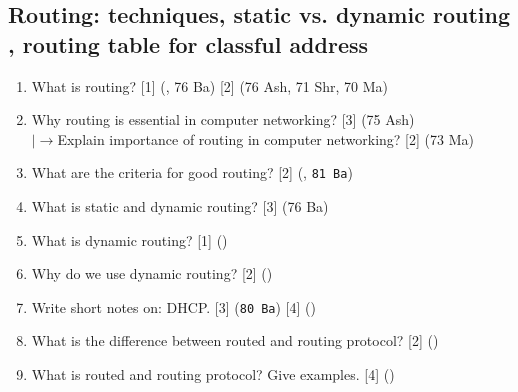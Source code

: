 \documentclass[12pt]{article}
\newcommand{\lb}{\\$\left|\rightarrow\right.$}
\begin{document}
	\subsection{Routing: techniques, static vs. dynamic routing , routing table for classful address}
		\begin{enumerate}[noitemsep, topsep=0pt]
			\item What is routing? \hfill [1] (, 76 Ba) [2] (76 Ash, 71 Shr, 70 Ma)

			\item Why routing is essential in computer networking? \hfill [3] (75 Ash)
			\lb Explain importance of routing in computer networking? \hfill [2] (73 Ma)
			
			\item What are the criteria for good routing? \hfill [2] (, \texttt{81 Ba})

			\item What is static and dynamic routing? \hfill [3] (76 Ba)
			
			\item What is dynamic routing? \hfill [1] ()
			
			\item Why do we use dynamic routing? \hfill [2] ()

			\item Write short notes on: DHCP. \hfill [3] (\texttt{80 Ba}) [4] ()

			\item What is the difference between routed and routing protocol? \hfill [2] ()
			
			\item What is routed and routing protocol? Give examples. \hfill [4] ()
		\end{enumerate}
\end{document}
